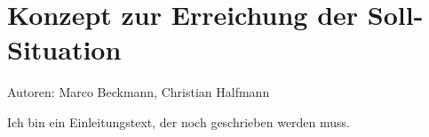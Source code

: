 \chapter{Konzept zur Erreichung der Soll-Situation}

Autoren: Marco Beckmann, Christian Halfmann

Ich bin ein Einleitungstext, der noch geschrieben werden muss.






